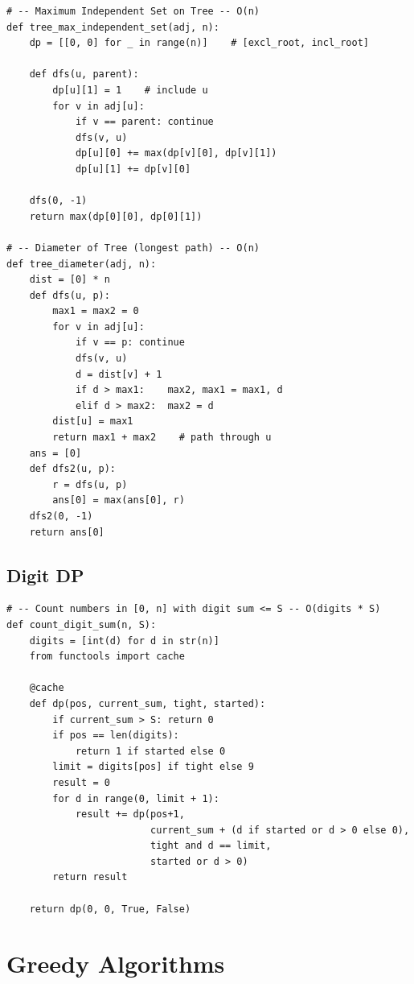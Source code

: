 \documentclass[11pt,a4paper]{report}
\begin{document}
\begin{lstlisting}
# -- Maximum Independent Set on Tree -- O(n)
def tree_max_independent_set(adj, n):
    dp = [[0, 0] for _ in range(n)]    # [excl_root, incl_root]

    def dfs(u, parent):
        dp[u][1] = 1    # include u
        for v in adj[u]:
            if v == parent: continue
            dfs(v, u)
            dp[u][0] += max(dp[v][0], dp[v][1])
            dp[u][1] += dp[v][0]

    dfs(0, -1)
    return max(dp[0][0], dp[0][1])

# -- Diameter of Tree (longest path) -- O(n)
def tree_diameter(adj, n):
    dist = [0] * n
    def dfs(u, p):
        max1 = max2 = 0
        for v in adj[u]:
            if v == p: continue
            dfs(v, u)
            d = dist[v] + 1
            if d > max1:    max2, max1 = max1, d
            elif d > max2:  max2 = d
        dist[u] = max1
        return max1 + max2    # path through u
    ans = [0]
    def dfs2(u, p):
        r = dfs(u, p)
        ans[0] = max(ans[0], r)
    dfs2(0, -1)
    return ans[0]
\end{lstlisting}

\section{Digit DP}

\begin{lstlisting}
# -- Count numbers in [0, n] with digit sum <= S -- O(digits * S)
def count_digit_sum(n, S):
    digits = [int(d) for d in str(n)]
    from functools import cache

    @cache
    def dp(pos, current_sum, tight, started):
        if current_sum > S: return 0
        if pos == len(digits):
            return 1 if started else 0
        limit = digits[pos] if tight else 9
        result = 0
        for d in range(0, limit + 1):
            result += dp(pos+1,
                         current_sum + (d if started or d > 0 else 0),
                         tight and d == limit,
                         started or d > 0)
        return result

    return dp(0, 0, True, False)
\end{lstlisting}

\chapter{Greedy Algorithms}
\end{document}
